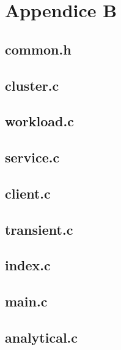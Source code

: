 \chapter{Appendice B}\label{appendiceB}
\lstset{frame=}
\section{common.h}

\pagebreak
\section{cluster.c}

\pagebreak
\section{workload.c}

\pagebreak
\section{service.c}

\pagebreak
\section{client.c}

\pagebreak
\section{transient.c}

\pagebreak
\section{index.c}

\pagebreak
\section{main.c}

\pagebreak
\section{analytical.c}
